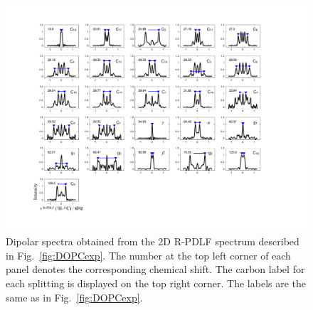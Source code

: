 \documentclass[fleqn,10pt]{wlscirepSI}
\begin{document}
\begin{figure}[p]
  \includegraphics[width=\textwidth]{Figures/DOPC_slices.pdf}
  \caption{Dipolar spectra obtained from the 2D R-PDLF spectrum described in Fig.~\ref{fig:DOPCexp}. The number at the top left corner of each panel denotes the corresponding chemical shift. The carbon label for each splitting is displayed on the top right corner. The labels are the same as in Fig.~\ref{fig:DOPCexp}. }
  \label{DOPCexp2}
\end{figure}





\pagebreak



\end{document}

